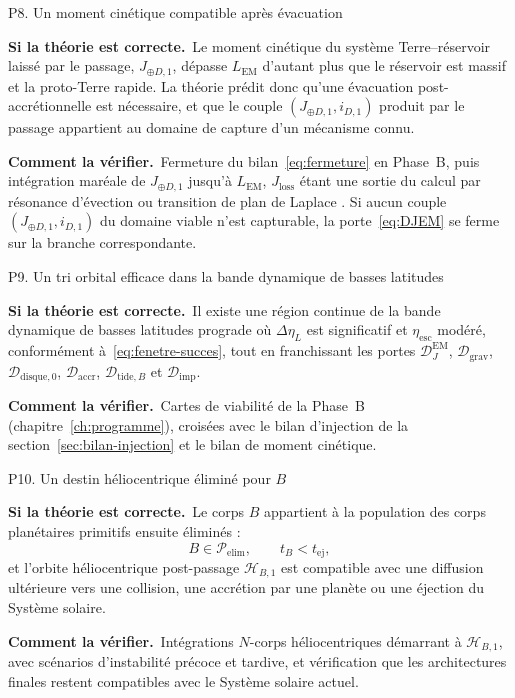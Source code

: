 \documentclass[11pt,a4paper,openany]{report}
\newcommand{\sila}{\par\noindent\textbf{Si la théorie est correcte.}\ }
\newcommand{\verif}{\par\smallskip\noindent\textbf{Comment la vérifier.}\ }
\begin{document}
\begin{prediction}{P8. Un moment cinétique compatible après évacuation}
\sila Le moment cinétique du système Terre--réservoir laissé par le passage, $J_{\oplus D,1}$,
dépasse $L_{\mathrm{EM}}$ d'autant plus que le réservoir est massif et la proto-Terre rapide. La
théorie prédit donc qu'une évacuation post-accrétionnelle est nécessaire, et que le couple
$(J_{\oplus D,1},i_{D,1})$ produit par le passage appartient au domaine de capture d'un mécanisme
connu.
\verif Fermeture du bilan~\eqref{eq:fermeture} en Phase~B, puis intégration maréale de
$J_{\oplus D,1}$ jusqu'à $L_{\mathrm{EM}}$, $J_{\mathrm{loss}}$ étant une sortie du calcul
par résonance d'évection ou transition de plan de Laplace
\cite{MurrayDermott1999,TremaineTouma2009}. Si aucun couple $(J_{\oplus D,1},i_{D,1})$ du domaine
viable n'est capturable, la porte~\eqref{eq:DJEM} se ferme sur la branche correspondante.
\end{prediction}

\begin{prediction}{P9. Un tri orbital efficace dans la bande dynamique de basses latitudes}
\sila Il existe une région continue de la bande dynamique de basses latitudes prograde où $\Delta\eta_L$ est
significatif et $\eta_{\mathrm{esc}}$ modéré, conformément à~\eqref{eq:fenetre-succes}, tout en
franchissant les portes $\mathcal{D}_J^{\mathrm{EM}}$, $\mathcal{D}_{\mathrm{grav}}$,
$\mathcal{D}_{\mathrm{disque},0}$, $\mathcal{D}_{\mathrm{accr}}$,
$\mathcal{D}_{\mathrm{tide},B}$ et $\mathcal{D}_{\mathrm{imp}}$.
\verif Cartes de viabilité de la Phase~B (chapitre~\ref{ch:programme}), croisées avec le bilan
d'injection de la section~\ref{sec:bilan-injection} et le bilan de moment cinétique.
\end{prediction}

\begin{prediction}{P10. Un destin héliocentrique éliminé pour \texorpdfstring{$B$}{B}}
\sila Le corps $B$ appartient à la population des corps planétaires primitifs ensuite éliminés :
\begin{equation}
B\in\mathcal{P}_{\mathrm{elim}},\qquad t_B<t_{\mathrm{ej}},
\label{eq:predB}
\end{equation}
et l'orbite héliocentrique post-passage $\mathcal{H}_{B,1}$ est compatible avec une diffusion
ultérieure vers une collision, une accrétion par une planète ou une éjection du Système solaire.
\verif Intégrations $N$-corps héliocentriques démarrant à $\mathcal{H}_{B,1}$, avec scénarios
d'instabilité précoce et tardive, et vérification que les architectures finales restent compatibles
avec le Système solaire actuel.
\end{prediction}
\end{document}
